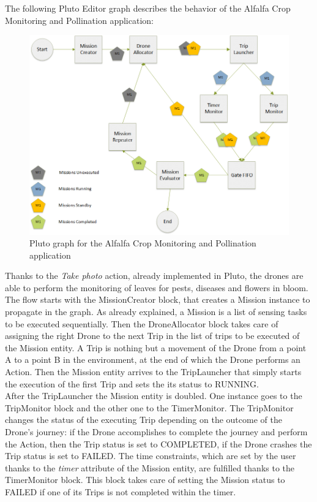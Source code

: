 The following Pluto Editor graph describes the behavior of the Alfalfa Crop Monitoring and Pollination\cite{alfalfa} application:

\begin{figure}[H]
  \centering
  \includegraphics[width=\linewidth]{pictures/Alfalfa_Diagram.png}
  \caption{Pluto graph for the Alfalfa Crop Monitoring and Pollination application}
  \label{fig:alfalfaGraph}
\end{figure}

\newpage 

Thanks to the \textit{Take photo} action, already implemented in Pluto, the drones are able to perform the monitoring of leaves for pests, diseases and flowers in bloom.
\\

The flow starts with the MissionCreator block, that creates a Mission instance to propagate in the graph.
As already explained, a Mission is a list of sensing tasks to be executed sequentially.
Then the DroneAllocator block takes care of assigning the right Drone to the next Trip in the list of trips to be executed of the Mission entity.
A Trip is nothing but a movement of the Drone from a point A to a point B in the environment, at the end of which the Drone performs an Action.
Then the Mission entity arrives to the TripLauncher that simply starts the execution of the first Trip and sets the its status to RUNNING.
\\

After the TripLauncher the Mission entity is doubled. One instance goes to the TripMonitor block and the other one to the TimerMonitor.
The TripMonitor changes the status of the executing Trip depending on the outcome of the Drone's journey:
if the Drone accomplishes to complete the journey and perform the Action, then the Trip status is set to COMPLETED,
if the Drone crashes the Trip status is set to FAILED.
The time constraints, which are set by the user thanks to the \textit{timer} attribute of the Mission entity, are fulfilled thanks to the TimerMonitor block.
This block takes care of setting the Mission status to FAILED if one of its Trips is not completed within the timer.
\\


